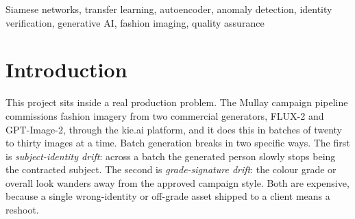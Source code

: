 \documentclass[conference]{IEEEtran}
\begin{document}
\begin{abstract}
consistency failures: \emph{subject-identity drift}, where the generated person
stops being the contracted subject, and \emph{grade-signature drift}, where the
approved colour look departs. This paper implements and evaluates a
two-component machine-learning quality-assurance gate. The primary component is
a Siamese network with a frozen ResNet50 backbone that classifies image pairs as
same- or different-subject; the secondary component is a convolutional
autoencoder trained only on compliant imagery whose reconstruction error serves
as an unsupervised grade-drift signal. Both are benchmarked against a
pixel-difference baseline and a $k$-nearest-neighbour baseline over the same
embedding space, using a curated set of 106 proprietary author-generated images.
The Siamese network attained $F_1 = 0.90$ at perfect precision and
$\mathrm{ROC\text{-}AUC} = 1.0$, far exceeding the pixel-difference
($F_1 = 0.59$) and kNN ($F_1 = 0.26$) baselines, while the autoencoder flagged
62\% of synthetic off-grade probes at a 10\% false-alarm rate. The results show
that metric learning over frozen convolutional embeddings offers a scalable,
interpretable QA layer for AI-generated brand imagery.
\end{abstract}

\begin{IEEEkeywords}
Siamese networks, transfer learning, autoencoder, anomaly detection,
identity verification, generative AI, fashion imaging, quality assurance
\end{IEEEkeywords}

\section{Introduction}

This project sits inside a real production problem. The Mullay campaign pipeline
commissions fashion imagery from two commercial generators, FLUX-2 and
GPT-Image-2, through the kie.ai platform, and it does this in batches of twenty
to thirty images at a time. Batch generation breaks in two specific ways. The
first is \emph{subject-identity drift}: across a batch the generated person
slowly stops being the contracted subject. The second is \emph{grade-signature
drift}: the colour grade or overall look wanders away from the approved campaign
style. Both are expensive, because a single wrong-identity or off-grade asset
shipped to a client means a reshoot.
\end{document}
